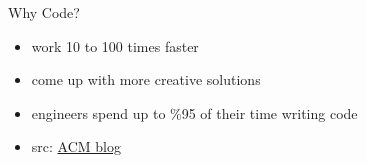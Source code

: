 \documentclass[xcolor={dvipsnames}]{beamer}
\begin{document}
\begin{frame}{Why Code?}
\begin{itemize}
	\item work 10 to 100 times faster 
	\item come up with more creative solutions
	\item engineers spend up to \%95 of their time writing code
	\item src: \href{ http://cacm.acm.org/blogs/blog-cacm/166115-why-scientists-and-engineers-must-learn-programming/fulltext}{ACM blog}
\end{itemize}
\end{frame}
\end{document}
